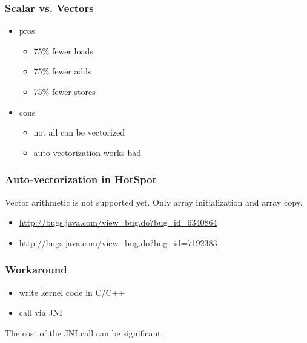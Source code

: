 \documentclass{beamer}
\begin{document}
  	\begin{frame}
    		\frametitle{Scalar vs. Vectors}
    		\begin{itemize}
    		    \item pros
    		    \begin{itemize}
    		    		\item 75\% fewer loads
    		    		\item 75\% fewer adds
    		    		\item 75\% fewer stores
    		    \end{itemize}
    		    \item cons
    		    \begin{itemize}
    		    		\item not all can be vectorized
    		    		\item auto-vectorization works bad
    		    \end{itemize}
		\end{itemize}
  	\end{frame}  	
  	\begin{frame}
  		\frametitle{Auto-vectorization in HotSpot}
		Vector arithmetic is not supported yet. Only array initialization and array copy.
  		\begin{itemize}
  			\item \url{http://bugs.java.com/view_bug.do?bug_id=6340864}
  			\item \url{http://bugs.java.com/view_bug.do?bug_id=7192383}
  		\end{itemize}
  	\end{frame}
  	\begin{frame}
  	  	\frametitle{Workaround}
  	  	\begin{itemize}
  	  	\item write kernel code in C/C++
  	  	\item call via JNI
  	  	\end{itemize}
  	  	\pause
  	  	\vskip15pt 
  	  	The cost of the JNI call can be significant.
  	\end{frame}
\end{document}

